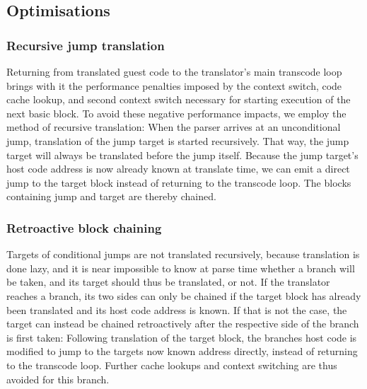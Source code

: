 \subsection{Optimisations}
\label{sec:optimise}

\subsubsection{Recursive jump translation}
\label{sec:recursive_translation}
Returning from translated guest code to the translator's main transcode loop brings with it the performance penalties imposed by the context switch, code cache lookup, and second context switch necessary for starting execution of the next basic block. To avoid these negative performance impacts, we employ the method of recursive translation: When the parser arrives at an unconditional jump, translation of the jump target is started recursively. That way, the jump target will always be translated before the jump itself. Because the jump target's host code address is now already known at translate time, we can emit a direct jump to the target block instead of returning to the transcode loop. The blocks containing jump and target are thereby chained.

\subsubsection{Retroactive block chaining}
\label{sec:chaining}
Targets of conditional jumps are not translated recursively, because translation is done lazy, and it is near impossible to know at parse time whether a branch will be taken, and its target should thus be translated, or not. If the translator reaches a branch, its two sides can only be chained if the target block has already been translated and its host code address is known. If that is not the case, the target can instead be chained retroactively after the respective side of the branch is first taken: Following translation of the target block, the branches host code is modified to jump to the targets now known address directly, instead of returning to the transcode loop. Further cache lookups and context switching are thus avoided for this branch.

